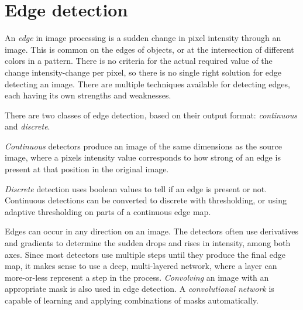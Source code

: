 \documentclass[12pt]{report}
\begin{document}
\section{Edge detection}
An \textit{edge} in image processing is a sudden change in pixel intensity through an image. This is common on the edges of objects, or at the intersection of different colors in a pattern. There is no criteria for the actual required value of the change intensity-change per pixel, so there is no single right solution for edge detecting an image. There are multiple techniques available for detecting edges, each having its own strengths and weaknesses.\par
There are two classes of edge detection, based on their output format: \textit{continuous} and \textit{discrete}.\par
\textit{Continuous} detectors produce an image of the same dimensions as the source image, where a pixels intensity value corresponds to how strong of an edge is present at that position in the original image.\par
\textit{Discrete} detection uses boolean values to tell if an edge is present or not. Continuous detections can be converted to discrete with thresholding, or using adaptive thresholding on parts of a continuous edge map.\par
Edges can occur in any direction on an image. The detectors often use derivatives and gradients to determine the sudden drops and rises in intensity, among both axes. Since most detectors use multiple steps until they produce the final edge map, it makes sense to use a deep, multi-layered network, where a layer can more-or-less represent a step in the process. \textit{Convolving} an image with an appropriate mask is also used in edge detection. A \textit{convolutional network} is capable of learning and applying combinations of masks automatically.
\end{document}

